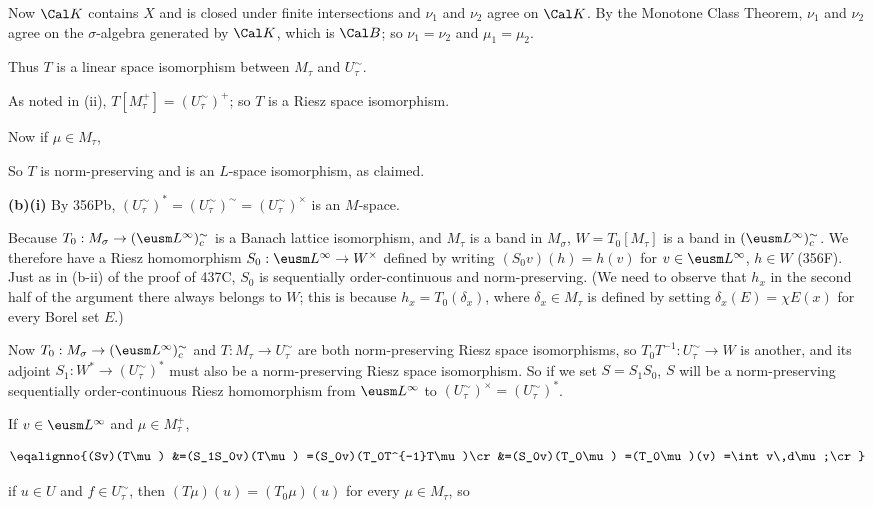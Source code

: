 {

\noindent Now $\Cal K$ contains $X$ and is closed under finite
intersections and $\nu_1$ and $\nu_2$ agree on $\Cal K$.   By the
Monotone Class Theorem, $\nu_1$ and $\nu_2$ agree on the
$\sigma$-algebra generated by $\Cal K$, which is $\Cal B$;  so
$\nu_1=\nu_2$ and $\mu_1=\mu_2$.\ \Qed

Thus $T$ is a linear space isomorphism between $M_{\tau}$ and
$U^{\sim}_{\tau}$.

\medskip

 As noted in (ii), $T[M_{\tau}^+]=(U^{\sim}_{\tau})^+$;
so $T$ is a Riesz space isomorphism.

\medskip

 Now if $\mu\in M_{\tau}$,


\noindent So $T$ is norm-preserving and is an $L$-space isomorphism, as
claimed.

\medskip

{\bf (b)(i)} By 356Pb, $(U^{\sim}_{\tau})^*=(U^{\sim}_{\tau})^{\sim}
=(U^{\sim}_{\tau})^{\times}$ is an $M$-space.

\medskip

 Because $T_0:M_{\sigma}\to(\eusm L^{\infty})^{\sim}_c$
is a Banach lattice isomorphism, and $M_{\tau}$ is a band in
$M_{\sigma}$, $W=T_0[M_{\tau}]$ is a band in
$(\eusm L^{\infty})^{\sim}_c$.   We therefore have a Riesz homomorphism
$S_0:\eusm L^{\infty}\to W^{\times}$ defined by writing $(S_0v)(h)=h(v)$
for $v\in\eusm L^{\infty}$, $h\in W$ (356F).   Just as in (b-ii) of the
proof of 437C, $S_0$ is sequentially order-continuous and
norm-preserving.   (We need to observe that $h_x$ in the second half of
the argument there always belongs to $W$;  this is because
$h_x=T_0(\delta_x)$, where $\delta_x\in M_{\tau}$ is defined by setting
$\delta_x(E)=\chi E(x)$ for every Borel set $E$.)

\medskip

 Now $T_0:M_{\sigma}\to(\eusm L^{\infty})^{\sim}_c$ and
$T:M_{\tau}\to U^{\sim}_{\tau}$ are both norm-preserving Riesz space
isomorphisms, so $T_0T^{-1}:U^{\sim}_{\tau}\to W$ is another, and its
adjoint $S_1:W^*\to(U^{\sim}_{\tau})^*$ must also be a
norm-preserving Riesz space isomorphism.   So if we set $S=S_1S_0$, $S$
will be a norm-preserving sequentially order-continuous Riesz
homomorphism from $\eusm L^{\infty}$ to
$(U^{\sim}_{\tau})^{\times}=(U^{\sim}_{\tau})^*$.

\medskip

 If $v\in\eusm L^{\infty}$ and $\mu\in M_{\tau}^+$,

$$\eqalignno{(Sv)(T\mu)
&=(S_1S_0v)(T\mu)
=(S_0v)(T_0T^{-1}T\mu)\cr
&=(S_0v)(T_0\mu)
=(T_0\mu)(v)
=\int v\,d\mu;\cr}$$

\noindent if $u\in U$ and $f\in U^{\sim}_{\tau}$, then
$(T\mu)(u)=(T_0\mu)(u)$ for every $\mu\in M_{\tau}$, so

}%

